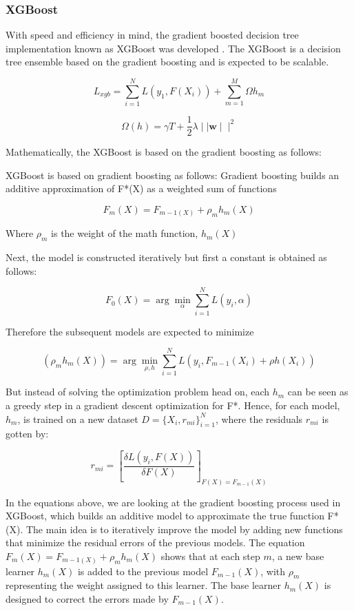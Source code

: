 \documentclass[12pt, a4paper,twoside]{report}
\numberwithin{equation}{chapter}
\begin{document}
\subsubsection{XGBoost}

With speed and efficiency in mind, the gradient boosted decision tree implementation known as XGBoost was developed \parencite{raschka-2020}. The XGBoost is a decision tree ensemble based on the gradient boosting and is expected to be scalable. 


\[L_{xgb} = \sum_{i=1}^{N} L(y_1, F(X_i)) + \sum_{m=1}^{M} \Omega h_m \]


\[\Omega(h) = \gamma T + \frac{1}{2} \lambda\mid \mid\textbf{w}\mid \mid ^2\]

Mathematically, the XGBoost is based on the gradient boosting as follows:


XGBoost is based on gradient boosting as follows:
Gradient boosting builds an additive approximation of F*(X) as a weighted sum of functions

\[F_m(X) = F_{m-1 (X)} + \rho_mh_m(X)\]

Where \(\rho_m\) is the weight of the math function, \(h_m(X)\)

Next, the model is constructed iteratively but first a constant is obtained as follows:

\[F_0(X) = \arg \min_{\alpha} \sum_{i=1}^{N} L(y_i, \alpha)\]

Therefore the subsequent models are expected to minimize

\[
(\rho_m h_m(X)) = \arg\min_{\rho, h} \sum_{i=1}^{N} L(y_i, F_{m-1}(X_i) + \rho h(X_i))
\]


But instead of solving the optimization problem head on, each \(h_m\) can be seen as a greedy step in a gradient descent optimization for F*. Hence, for each model, \(h_m\), is trained on a new dataset \(D = \{X_i, r_{mi}\}_{i=1}^{N}\), where the residuals \(r_{mi}\) is gotten by:

\[r_{mi} = [\frac{\delta L (y_i, F(X))}{\delta F(X)}]_{F(X)=F_{m-1}(X)}\]

In the equations above, we are looking at the gradient boosting process used in XGBoost, which builds an additive model to approximate the true function F*(X). The main idea is to iteratively improve the model by adding new functions that minimize the residual errors of the previous models. The equation \(F_m(X) = F_{m-1 (X)} + \rho_mh_m(X)\) shows that at each step \(m\), a new base learner \(h_m(X)\) is added to the previous model \(F_{m - 1}(X)\), with \(\rho_m\) representing the weight assigned to this learner. The base learner \(h_m(X)\) is designed to correct the errors made by \(F_{m - 1}(X)\).
\end{document}
